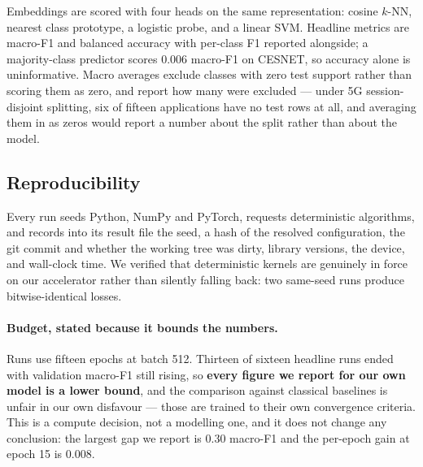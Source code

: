 Embeddings are scored with four heads on the same representation: cosine
$k$-NN, nearest class prototype, a logistic probe, and a linear SVM. Headline
metrics are macro-F1 and balanced accuracy with per-class F1 reported
alongside; a majority-class predictor scores 0.006 macro-F1 on CESNET, so
accuracy alone is uninformative. Macro averages exclude classes with zero test
support rather than scoring them as zero, and report how many were excluded ---
under 5G session-disjoint splitting, six of fifteen applications have no test
rows at all, and averaging them in as zeros would report a number about the
split rather than about the model.

\subsection{Reproducibility}

Every run seeds Python, NumPy and PyTorch, requests deterministic algorithms,
and records into its result file the seed, a hash of the resolved
configuration, the git commit and whether the working tree was dirty, library
versions, the device, and wall-clock time. We verified that deterministic
kernels are genuinely in force on our accelerator rather than silently falling
back: two same-seed runs produce bitwise-identical losses.

\paragraph{Budget, stated because it bounds the numbers.} Runs use fifteen
epochs at batch 512. Thirteen of sixteen headline runs ended with validation
macro-F1 still rising, so \textbf{every figure we report for our own model is a
lower bound}, and the comparison against classical baselines is unfair in our
own disfavour --- those are trained to their own convergence criteria. This is
a compute decision, not a modelling one, and it does not change any conclusion:
the largest gap we report is 0.30 macro-F1 and the per-epoch gain at epoch 15
is 0.008.
